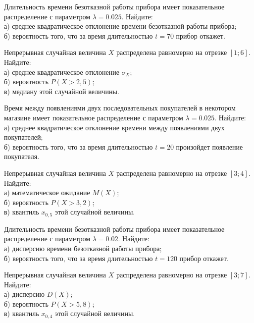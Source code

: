 \vfill

\z Длительность времени безотказной работы прибора имеет показательное распределение с параметром $\lambda = 0.025$. Найдите: \\ \quad а) среднее квадратическое отклонение времени безотказной работы прибора; \\ \quad б) вероятность того, что за время длительностью $t = 70$ прибор  откажет.
 

\vfill

\newpage\setcounter{zad}{0}

\z Непрерывная случайная величина $X$ распределена равномерно на отрезке $[1; 6]$. Найдите: \\ \quad а) среднее квадратическое отклонение $\sigma_X$; \\ \quad б) вероятность $P(X>2{,}5)$; \\ \quad в) медиану этой случайной величины.


\vfill

\z Время между появлениями двух последовательных покупателей в некотором магазине имеет показательное распределение с параметром $\lambda = 0.025$. Найдите: \\ \quad а) среднее квадратическое отклонение времени между появлениями двух покупателей; \\ \quad б) вероятность того, что за время длительностью $t = 20$  произойдет появление покупателя.
 

\vfill

\newpage\setcounter{zad}{0}

\z Непрерывная случайная величина $X$ распределена равномерно на отрезке $[3; 4]$. Найдите: \\ \quad а) математическое ожидание $M(X)$; \\ \quad б) вероятность $P(X>3{,}2)$; \\ \quad в) квантиль $x_{0{,}5}$ этой случайной величины.


\vfill

\z Длительность времени безотказной работы прибора имеет показательное распределение с параметром $\lambda = 0.02$. Найдите: \\ \quad а) дисперсию времени безотказной работы прибора; \\ \quad б) вероятность того, что за время длительностью $t = 120$ прибор  откажет.
 

\vfill

\newpage\setcounter{zad}{0}

\z Непрерывная случайная величина $X$ распределена равномерно на отрезке $[3; 7]$. Найдите: \\ \quad а) дисперсию $D(X)$; \\ \quad б) вероятность $P(X>5{,}8)$; \\ \quad в) квантиль $x_{0{,}4}$ этой случайной величины.


